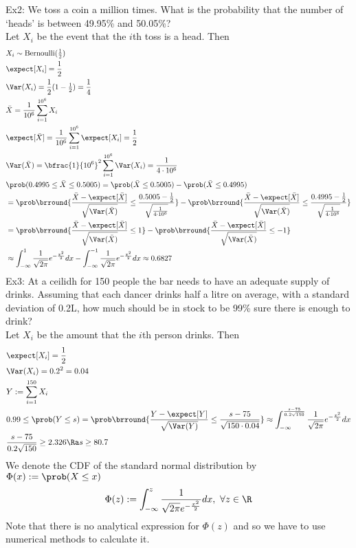 Ex2: We toss a coin a million times. What is the probability that the number of `heads' is between 49.95\% and 50.05\%?\\
Let $X_i$ be the event that the $i$th toss is a head. Then
\begin{align*}
    &X_i\sim\mathrm{Bernoulli}(\tfrac{1}{2})\\
    &\expect[X_i]=\frac{1}{2}\\
    &\Var(X_i)=\frac{1}{2}(1-\tfrac{1}{2})=\frac{1}{4}\\
    &\bar{X}=\frac{1}{10^6}\sum_{i=1}^{10^6}X_i\\
    &\expect[\bar{X}]=\frac{1}{10^6}\sum_{i=1}^{10^6}\expect[X_i]=\frac{1}{2}\\
    &\Var(\bar{X})=\bfrac{1}{10^{6}}^2\sum_{i=1}^{10^6}\Var(X_i)=\frac{1}{4\cdot10^6}\\
    &\prob(0.4995\leq\bar{X}\leq0.5005)=\prob(\bar{X}\leq0.5005)-\prob(\bar{X}\leq0.4995)\\
    &=\prob\brround{\frac{\bar{X}-\expect[\bar{X}]}{\sqrt{\Var(\bar{X})}}\leq\frac{0.5005-\frac{1}{2}}{\sqrt{\frac{1}{4\cdot 10^6}}}}-\prob\brround{\frac{\bar{X}-\expect[\bar{X}]}{\sqrt{\Var(\bar{X})}}\leq\frac{0.4995-\frac{1}{2}}{\sqrt{\frac{1}{4\cdot 10^6}}}}\\
    &=\prob\brround{\frac{\bar{X}-\expect[\bar{X}]}{\sqrt{\Var(\bar{X})}}\leq1}-\prob\brround{\frac{\bar{X}-\expect[\bar{X}]}{\sqrt{\Var(\bar{X})}}\leq-1}\\
    &\approx\int_{-\infty}^1\frac{1}{\sqrt{2\pi}}e^{-\frac{x^2}{2}}dx-\int_{-\infty}^{-1}\frac{1}{\sqrt{2\pi}}e^{-\frac{x^2}{2}}dx\approx 0.6827
\end{align*}
Ex3: At a ceilidh for 150 people the bar needs to have an adequate supply of drinks. Assuming that each dancer drinks half a litre on average, with a standard deviation of 0.2L, how much should be in stock to be 99\% sure there is enough to drink?\\
Let $X_i$ be the amount that the $i$th person drinks. Then
\begin{align*}
    &\expect[X_i]=\frac{1}{2}\\
    &\Var(X_i)=0.2^2=0.04\\
    &Y:=\sum_{i=1}^{150}X_i\\
    &0.99\leq\prob(Y\leq s)=\prob\brround{\frac{Y-\expect[Y]}{\sqrt{\Var(Y)}}\leq\frac{s-75}{\sqrt{150\cdot0.04}}}\approx\int_{-\infty}^{\frac{s-75}{0.2\sqrt{150}}}\frac{1}{\sqrt{2\pi}}e^{-\frac{x^2}{2}}dx\\
    &\frac{s-75}{0.2\sqrt{150}}\geq 2.326\Ra s\geq 80.7
\end{align*}
We denote the CDF of the standard normal distribution by $\Phi(x):=\prob(X\leq x)$
\[\Phi(z):=\int_{-\infty}^z\frac{1}{\sqrt{2\pi}e^{-\frac{x^2}{2}}}dx,\ \forall z\in\R\]
Note that there is no analytical expression for $\Phi(z)$ and so we have to use numerical methods to calculate it.\\

